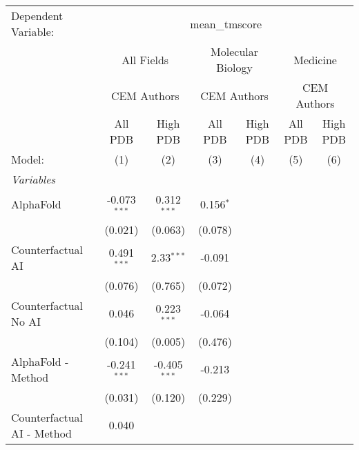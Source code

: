 \begingroup
\centering
\begin{tabular}{lcccccc}
   \tabularnewline \midrule \midrule
   Dependent Variable: & \multicolumn{6}{c}{mean\_tmscore}\\
 & \multicolumn{2}{c}{All Fields} & \multicolumn{2}{c}{Molecular Biology} & \multicolumn{2}{c}{Medicine} \\
\cmidrule(lr){2-3} \cmidrule(lr){4-5} \cmidrule(lr){6-7}
 & \multicolumn{2}{c}{CEM Authors} & \multicolumn{2}{c}{CEM Authors} & \multicolumn{2}{c}{CEM Authors} \\
\cmidrule(lr){2-3} \cmidrule(lr){4-5} \cmidrule(lr){6-7}
 & \multicolumn{1}{c}{All PDB} & \multicolumn{1}{c}{High PDB} & \multicolumn{1}{c}{All PDB} & \multicolumn{1}{c}{High PDB} & \multicolumn{1}{c}{All PDB} & \multicolumn{1}{c}{High PDB} \\
\cmidrule(lr){2-2} \cmidrule(lr){3-3} \cmidrule(lr){4-4} \cmidrule(lr){5-5} \cmidrule(lr){6-6} \cmidrule(lr){7-7}
   Model:                                   & (1)            & (2)            & (3)           & (4) & (5) & (6)\\  
   \midrule
   \emph{Variables}\\
   AlphaFold                                & -0.073$^{***}$ & 0.312$^{***}$  & 0.156$^{*}$   &     &     &   \\   
                                            & (0.021)        & (0.063)        & (0.078)       &     &     &   \\   
   Counterfactual AI                        & 0.491$^{***}$  & 2.33$^{***}$   & -0.091        &     &     &   \\   
                                            & (0.076)        & (0.765)        & (0.072)       &     &     &   \\   
   Counterfactual No AI                     & 0.046          & 0.223$^{***}$  & -0.064        &     &     &   \\   
                                            & (0.104)        & (0.005)        & (0.476)       &     &     &   \\   
   AlphaFold - Method                       & -0.241$^{***}$ & -0.405$^{***}$ & -0.213        &     &     &   \\   
                                            & (0.031)        & (0.120)        & (0.229)       &     &     &   \\   
   Counterfactual AI - Method               & 0.040          &                &               &     &     &   \\   

\end{tabular}

